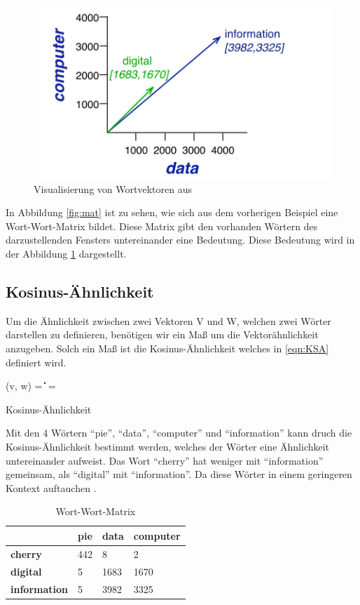 \documentclass[
        ngerman,
        paper=a4,
        numbers=noendperiod,
]{scrreprt}
\begin{document}
\begin{figure}[H]
    \centering\includegraphics[width=0.5\linewidth]{images/vec.png}
    \caption[Visualisierung von Wortvektoren]{Visualisierung von Wortvektoren aus \citep[S. 105]{Jurafsky2014SpeechProcessing}}
    \label{fig:vec}
\end{figure}



In Abbildung \ref{fig:mat} ist zu sehen, wie sich aus dem vorherigen Beispiel eine Wort-Wort-Matrix bildet. Diese Matrix gibt den vorhanden Wörtern des darzustellenden Fensters untereinander eine Bedeutung. Diese Bedeutung wird in der Abbildung \ref{fig:vec} dargestellt.

\subsection{Kosinus-Ähnlichkeit}
Um die Ähnlichkeit zwischen zwei Vektoren V und W, welchen zwei Wörter darstellen zu definieren, benötigen wir ein Maß um die Vektorähnlichkeit anzugeben. Solch ein Maß ist die Kosinus-Ähnlichkeit welches in \ref{eqn:KSA} definiert wird.

\begin{xequation-} 
\centering \cos(v, w) = { \cdot {} \over \|\| \|\|} = 
\caption[Kosinus-Ähnlichkeit]{Kosinus-Ähnlichkeit} 
    \label{eqn:KSA}
\end{xequation-} 

Mit den 4 Wörtern \enquote{pie}, \enquote{data}, \enquote{computer} und \enquote{information} kann druch die Kosinus-Ähnlichkeit bestimmt werden, welches der Wörter eine Ähnlichkeit untereinander aufweist. Das Wort \enquote{cherry} hat weniger mit \enquote{information} gemeinsam, als \enquote{digital} mit \enquote{information}. Da diese Wörter in einem geringeren Kontext auftauchen \citep[S. 105]{Jurafsky2014SpeechProcessing}.

\begin{table}[H]
{\small
    \begin{tabularx}{\textwidth}{X X X X} 
\hline     
                  &\textbf{pie}  & \textbf{data} & \textbf{computer}  \\ 
\hline    
    \textbf{cherry}      & 442        & 8 & 2         \\ 
    \textbf{digital}   & 5        & 1683 & 1670          \\ 
    \textbf{information} & 5        & 3982 & 3325           \\ 
    \end{tabularx}
\caption{Wort-Wort-Matrix}
    \label{tab:cos}
}
\end{table}
\end{document}
